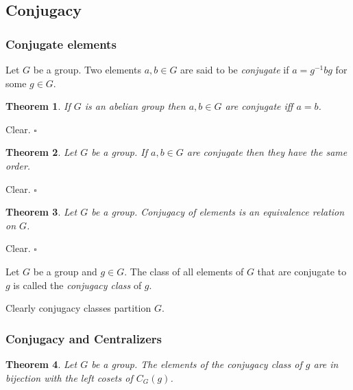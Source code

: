 \documentclass[10pt]{article}
\newtheorem{theorem}{Theorem}[section]
\newenvironment{proof}[1][Proof]{\begin{trivlist}
\item[\hskip \labelsep {\itshape #1}]}{\end{trivlist}}
\newenvironment{definition}[1][Definition]{\begin{trivlist}
\item[\hskip \labelsep {\bfseries #1}]}{\end{trivlist}}
\begin{document}
\subsection{Conjugacy}

\subsubsection{Conjugate elements}

\begin{definition}
Let $G$ be a group. Two elements $a, b \in G$ are said to be \emph{conjugate} if $a = g^{-1}bg$ for some $g \in G$.
\end{definition}

\begin{theorem}
If $G$ is an abelian group then $a, b \in G$ are conjugate iff $a = b$.
\end{theorem}

\begin{proof}
Clear. $\square$
\end{proof}

\begin{theorem}
Let $G$ be a group. If $a, b \in G$ are conjugate then they have the same order.
\end{theorem}

\begin{proof}
Clear. $\square$
\end{proof}

\begin{theorem}
Let $G$ be a group. Conjugacy of elements is an equivalence relation on $G$.
\end{theorem}

\begin{proof}
Clear. $\square$
\end{proof}

\begin{definition}
Let $G$ be a group and $g \in G$. The class of all elements of $G$ that are conjugate to $g$ is called the \emph{conjugacy class} of $g$.
\end{definition}

Clearly conjugacy classes partition $G$.

\subsubsection{Conjugacy and Centralizers}

\begin{theorem}\label{conjugacy}
Let $G$ be a group. The elements of the conjugacy class of $g$ are in bijection with the left cosets of $C_G(g)$.
\end{theorem}
\end{document}
